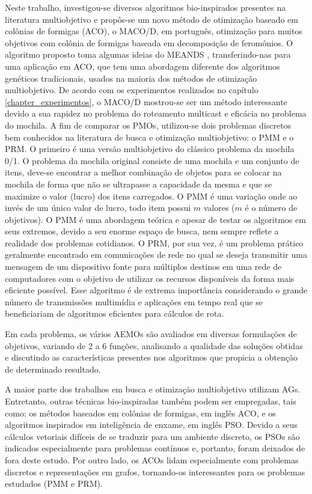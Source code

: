 Neste trabalho, investigou-se diversos algoritmos bio-inspirados presentes na literatura multiobjetivo e propôs-se um novo método de otimização baseado em colônias de formigas (ACO), o \ac{MACO/D}, em português, otimização para muitos objetivos com colônia de formigas baseada em decomposição de feromônios. O algoritmo proposto toma algumas ideias do MEANDS \cite{Lafeta2017}, transferindo-nas para uma aplicação em ACO, que tem uma abordagem diferente dos algoritmos genéticos tradicionais, usados na maioria dos métodos de otimização multiobjetivo. De acordo com os experimentos realizados no capítulo \ref{chapter_experimentos}, o MACO/D mostrou-se ser um método interessante devido a sua rapidez no problema do roteamento multicast e eficácia no problema do mochila. A fim de comparar os \acp{PMO}, utilizou-se dois problemas discretos bem conhecidos na literatura de busca e otimização multiobjetivo: o \ac{PMM} e o \ac{PRM}. O primeiro é uma versão multiobjetivo do clássico problema da mochila 0/1. O problema da mochila original consiste de uma mochila e um conjunto de itens, deve-se encontrar a melhor combinação de objetos para se colocar na mochila de forma que não se ultrapasse a capacidade da mesma e que se maximize o valor (lucro) dos itens carregados. O PMM é uma variação onde ao invés de um único valor de lucro, todo item possui $m$ valores ($m$ é o número de objetivos). O \ac{PMM} é uma abordagem teórica e apesar de testar os algoritmos em seus extremos, devido a seu enorme espaço de busca, nem sempre reflete a realidade dos problemas cotidianos. O \ac{PRM}, por sua vez, é um problema prático geralmente encontrado em comunicações de rede no qual se deseja transmitir uma mensagem de um dispositivo fonte para múltiplos destinos em uma rede de computadores com o objetivo de utilizar os recursos disponíveis da forma mais eficiente possível. Esse algoritmo é de extrema importância considerando o grande número de transmissões multimídia e aplicações em tempo real que se beneficiariam de algoritmos eficientes para cálculos de rota.

Em cada problema, os vários AEMOs são avaliados em diversas formulações de objetivos, variando de 2 a 6 funções, analisando a qualidade das soluções obtidas e discutindo as características presentes nos algoritmos que propicia a obtenção de determinado resultado. 

A maior parte dos trabalhos em busca e otimização multiobjetivo utilizam \acp{AG}. Entretanto, outras técnicas bio-inspiradas também podem ser empregadas, tais como: os métodos baseados em colônias de formigas, em inglês \ac{ACO}, e os algoritmos inspirados em inteligência de enxame, em inglês \ac{PSO}. Devido a seus cálculos vetoriais difíceis de se traduzir para um ambiente discreto, os \acp{PSO} são indicados especialmente para problemas contínuos e, portanto, foram deixados de fora deste estudo. Por outro lado, os \acp{ACO} lidam especialmente com problemas discretos e representações em grafos, tornando-os interessantes para os problemas estudados (PMM e PRM). 

